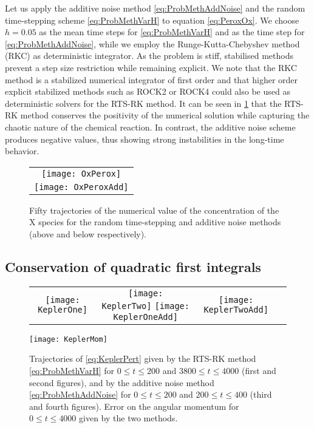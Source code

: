 \documentclass[10pt]{article}
\begin{document}
Let us apply the additive noise method \eqref{eq:ProbMethAddNoise} and the random time-stepping scheme \eqref{eq:ProbMethVarH} to equation \eqref{eq:PeroxOx}. We choose $h = 0.05$ as the mean time steps for \eqref{eq:ProbMethVarH} and as the time step for \eqref{eq:ProbMethAddNoise}, while we employ the Runge-Kutta-Chebyshev method (RKC) \cite{HoS80} as deterministic integrator. As the problem is stiff, stabilised methods prevent a step size restriction while remaining explicit. We note that the RKC method is a stabilized numerical integrator of first order and that higher order explicit stabilized methods such as ROCK2 or ROCK4 \cite{AbM01, Abd02} could also be used as deterministic solvers for the RTS-RK method. It can be seen in \cref{fig:OxPeroxTraj} that the RTS-RK method conserves the positivity of the numerical solution while capturing the chaotic nature of the chemical reaction. In contrast, the additive noise scheme produces negative values, thus showing strong instabilities in the long-time behavior.
\begin{figure}
	\begin{center} 
		\begin{tabular}{c}
			\texttt{[image: OxPerox]}\\
			\texttt{[image: OxPeroxAdd]}
		\end{tabular}
	\end{center}
	\caption{Fifty trajectories of the numerical value of the concentration of the $\mathrm X$ species for the random time-stepping and additive noise methods (above and below respectively).}
	\label{fig:OxPeroxTraj}
\end{figure}

\subsection{Conservation of quadratic first integrals} 

\begin{figure}[t]
	\begin{center}
		\begin{tabular}{cccc}
			\texttt{[image: KeplerOne]} & \texttt{[image: KeplerTwo]} \texttt{[image: KeplerOneAdd]} & \texttt{[image: KeplerTwoAdd]} \\
		\end{tabular}
	\texttt{[image: KeplerMom]}
	\end{center}
	\caption{Trajectories of \eqref{eq:KeplerPert} given by the RTS-RK method \eqref{eq:ProbMethVarH} for $0 \leq t \leq 200$ and $3800 \leq t \leq 4000$ (first and second figures), and by the additive noise method \eqref{eq:ProbMethAddNoise} for $0 \leq t \leq 200$ and $200 \leq t \leq 400$ (third and fourth figures). Error on the angular momentum for $0 \leq t \leq 4000$ given by the two methods.}
	\label{fig:Kepler}
\end{figure}
\end{document}
